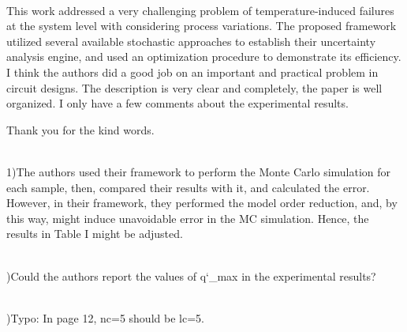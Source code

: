 \begin{reviewer}
\\
This work addressed a very challenging problem of temperature-induced failures
at the system level with considering process variations. The proposed framework
utilized several available stochastic approaches to establish their uncertainty
analysis engine, and used an optimization procedure to demonstrate its
efficiency. I think the authors did a good job on an important and practical
problem in circuit designs. The description is very clear and completely, the
paper is well organized. I only have a few comments about the experimental
results.
\end{reviewer}

\begin{authors}
  Thank you for the kind words.
\end{authors}

\begin{reviewer}
\noindent{}\\
1)The authors used their framework to perform the Monte Carlo
simulation for each sample, then, compared their results with it, and
calculated the error. However, in their framework, they performed the model
order reduction, and, by this way, might induce unavoidable error in the MC
simulation. Hence, the results in Table I might be adjusted.
\end{reviewer}

\begin{authors}
\begin{actions}
\end{actions}
\end{authors}

\begin{reviewer}
\\
)Could the authors report the values of q\char`_max in the
experimental results?
\end{reviewer}

\begin{authors}
\begin{actions}
\end{actions}
\end{authors}

\begin{reviewer}
\\
)Typo: In page 12, nc=5 should be lc=5.
\end{reviewer}

\begin{authors}
\begin{actions}
\end{actions}
\end{authors}
